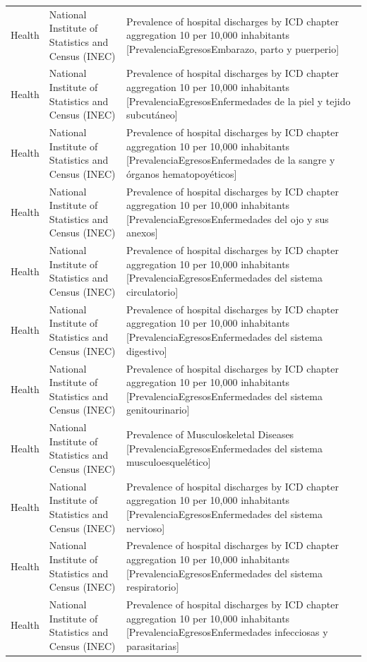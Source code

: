 \documentclass[10pt,a4paper]{article}
\begin{document}
\begin{longtable}{@{}>{\raggedright\arraybackslash}p{3.5cm}>{\raggedright\arraybackslash}p{5.6cm}>{\raggedright\arraybackslash}p{\dimexpr\textwidth-9.1cm-4\tabcolsep\relax}@{}}
Health & National Institute of Statistics and Census (INEC) & Prevalence of hospital discharges by ICD chapter aggregation 10 per 10,000 inhabitants [PrevalenciaEgresosEmbarazo, parto y puerperio]\\
Health & National Institute of Statistics and Census (INEC) & Prevalence of hospital discharges by ICD chapter aggregation 10 per 10,000 inhabitants [PrevalenciaEgresosEnfermedades de la piel y tejido subcut\'{a}neo]\\
Health & National Institute of Statistics and Census (INEC) & Prevalence of hospital discharges by ICD chapter aggregation 10 per 10,000 inhabitants [PrevalenciaEgresosEnfermedades de la sangre y \'{o}rganos hematopoy\'{e}ticos]\\
Health & National Institute of Statistics and Census (INEC) & Prevalence of hospital discharges by ICD chapter aggregation 10 per 10,000 inhabitants [PrevalenciaEgresosEnfermedades del ojo y sus anexos]\\
Health & National Institute of Statistics and Census (INEC) & Prevalence of hospital discharges by ICD chapter aggregation 10 per 10,000 inhabitants [PrevalenciaEgresosEnfermedades del sistema circulatorio]\\
Health & National Institute of Statistics and Census (INEC) & Prevalence of hospital discharges by ICD chapter aggregation 10 per 10,000 inhabitants [PrevalenciaEgresosEnfermedades del sistema digestivo]\\
Health & National Institute of Statistics and Census (INEC) & Prevalence of hospital discharges by ICD chapter aggregation 10 per 10,000 inhabitants [PrevalenciaEgresosEnfermedades del sistema genitourinario]\\
Health & National Institute of Statistics and Census (INEC) & Prevalence of Musculoskeletal Diseases [PrevalenciaEgresosEnfermedades del sistema musculoesquel\'{e}tico]\\
Health & National Institute of Statistics and Census (INEC) & Prevalence of hospital discharges by ICD chapter aggregation 10 per 10,000 inhabitants [PrevalenciaEgresosEnfermedades del sistema nervioso]\\
Health & National Institute of Statistics and Census (INEC) & Prevalence of hospital discharges by ICD chapter aggregation 10 per 10,000 inhabitants [PrevalenciaEgresosEnfermedades del sistema respiratorio]\\
Health & National Institute of Statistics and Census (INEC) & Prevalence of hospital discharges by ICD chapter aggregation 10 per 10,000 inhabitants [PrevalenciaEgresosEnfermedades infecciosas y parasitarias]\\

\end{longtable}
\end{document}
